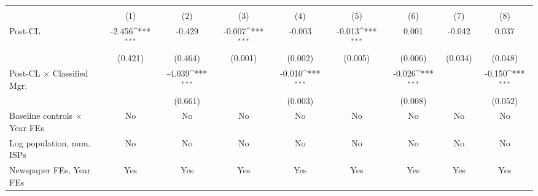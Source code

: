 {
\def\sym#1{\ifmmode^{#1}\else\(^{#1}\)\fi}
\begin{tabular}{l*{8}{c}}
\toprule
                    &&&&\\\cmidrule(lr){2-3}\cmidrule(lr){4-5}\cmidrule(lr){6-7}\cmidrule(lr){8-9}
                    &         &         &         &         &         &         &         &         \\
\midrule
Post-CL             &      -2.456\sym{***}&      -0.429         &      -0.007\sym{***}&      -0.003         &      -0.013\sym{***}&       0.001         &      -0.042         &       0.037         \\
                    &     (0.421)         &     (0.464)         &     (0.001)         &     (0.002)         &     (0.005)         &     (0.006)         &     (0.034)         &     (0.048)         \\
\addlinespace
Post-CL $\times$ Classified Mgr.&                     &      -4.039\sym{***}&                     &      -0.010\sym{***}&                     &      -0.026\sym{***}&                     &      -0.150\sym{***}\\
                    &                     &     (0.661)         &                     &     (0.003)         &                     &     (0.008)         &                     &     (0.052)         \\
\addlinespace
Baseline controls $\times$ Year FEs &          No         &          No         &          No         &          No         &          No         &          No         &          No         &          No         \\
\addlinespace
Log population, num. ISPs &          No         &          No         &          No         &          No         &          No         &          No         &          No         &          No         \\
\addlinespace
Newspaper FEs, Year FEs &         Yes         &         Yes         &         Yes         &         Yes         &         Yes         &         Yes         &         Yes         &         Yes         \\

\end{tabular}}
